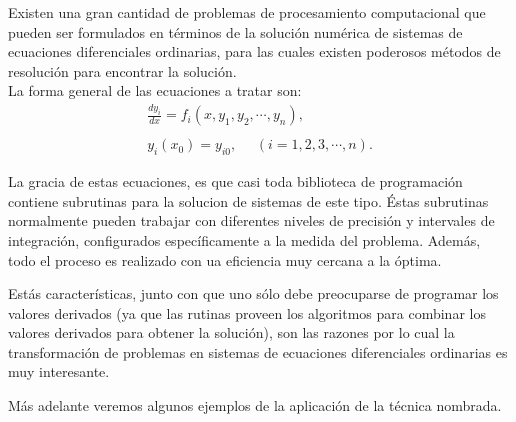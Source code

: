 Existen una gran cantidad de problemas de procesamiento computacional que
pueden ser formulados en términos de la solución numérica de sistemas de
ecuaciones diferenciales ordinarias, para las cuales existen poderosos métodos
de resolución para encontrar la solución.\\

La forma general de las ecuaciones a tratar son:
\begin{eqnarray}
\frac{dy_i}{dx} = f_i (x, y_1, y_2 , \cdots, y_n), \nonumber \\
		\\
y_i (x_0) = y_{i0} ,\ \ \ \ \ \	(i  = 1, 2, 3, \cdots, n). \nonumber
\end{eqnarray}

La gracia de estas ecuaciones, es que casi toda biblioteca de programación
contiene subrutinas para la solucion de sistemas de este tipo. Éstas
subrutinas normalmente pueden trabajar con diferentes niveles de precisión y
intervales de integración, configurados específicamente a la medida del
problema. Además, todo el proceso es realizado con ua eficiencia muy cercana a
la óptima.

Estás características, junto con que uno sólo debe preocuparse de programar los
valores derivados (ya que las rutinas proveen los algoritmos
para combinar los valores derivados para obtener la solución), son las razones
por lo cual la transformación de problemas en sistemas de ecuaciones
diferenciales ordinarias es muy interesante.

Más adelante veremos algunos ejemplos de la aplicación de la técnica nombrada.
